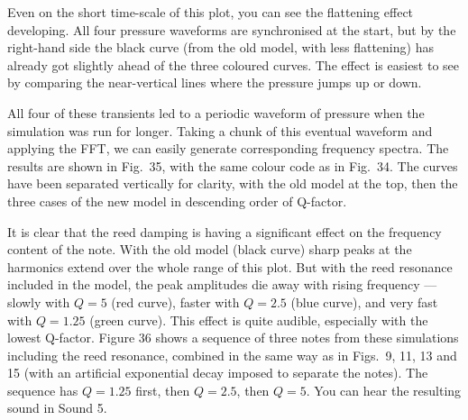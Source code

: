 
  Even on the short time-scale of this plot, you can see the flattening effect 
  developing. All four pressure waveforms are synchronised at the start, but by 
  the right-hand side the black curve (from the old model, with less 
  flattening) has already got slightly ahead of the three coloured curves. The 
  effect is easiest to see by comparing the near-vertical lines where the 
  pressure jumps up or down. 

  All four of these transients led to a periodic waveform of pressure when the 
  simulation was run for longer. Taking a chunk of this eventual waveform and 
  applying the FFT, we can easily generate corresponding frequency spectra. The 
  results are shown in Fig.\ 35, with the same colour code as in Fig.\ 34. The 
  curves have been separated vertically for clarity, with the old model at the 
  top, then the three cases of the new model in descending order of Q-factor. 


  It is clear that the reed damping is having a significant effect on the 
  frequency content of the note. With the old model (black curve) sharp peaks 
  at the harmonics extend over the whole range of this plot. But with the reed 
  resonance included in the model, the peak amplitudes die away with rising 
  frequency — slowly with $Q=5$ (red curve), faster with $Q=2.5$ (blue curve), 
  and very fast with $Q=1.25$ (green curve). This effect is quite audible, 
  especially with the lowest Q-factor. Figure 36 shows a sequence of three 
  notes from these simulations including the reed resonance, combined in the 
  same way as in Figs.\ 9, 11, 13 and 15 (with an artificial exponential decay 
  imposed to separate the notes). The sequence has $Q=1.25$ first, then 
  $Q=2.5$, then $Q=5$. You can hear the resulting sound in Sound 5. 

